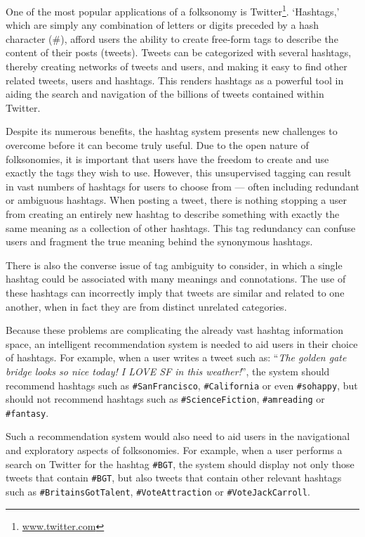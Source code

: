 \documentclass[12pt,a4paper]{article}
\begin{document}
One of the most popular applications of a folksonomy is Twitter\footnote{\url{www.twitter.com}}. `Hashtags,' which are simply any combination of letters or digits preceded by a hash character (\#), afford users the ability to create free-form tags to describe the content of their posts (tweets). Tweets can be categorized with several hashtags, thereby creating networks of tweets and users, and making it easy to find other related tweets, users and hashtags. This renders hashtags as a powerful tool in aiding the search and navigation of the billions of tweets contained within Twitter.

Despite its numerous benefits, the hashtag system presents new challenges to overcome before it can become truly useful. Due to the open nature of folksonomies, it is important that users have the freedom to create and use exactly the tags they wish to use. However, this unsupervised tagging can result in vast numbers of hashtags for users to choose from --- often including redundant or ambiguous hashtags. When posting a tweet, there is nothing stopping a user from creating an entirely new hashtag to describe something with exactly the same meaning as a collection of other hashtags. This tag redundancy can confuse users and fragment the true meaning behind the synonymous hashtags.

There is also the converse issue of tag ambiguity to consider, in which a single hashtag could be associated with many meanings and connotations. The use of these hashtags can incorrectly imply that tweets are similar and related to one another, when in fact they are from distinct unrelated categories.

Because these problems are complicating the already vast hashtag information space, an intelligent recommendation system is needed to aid users in their choice of hashtags. For example, when a user writes a tweet such as: ``\emph{The golden gate bridge looks so nice today! I LOVE SF in this weather!}'', the system should recommend hashtags such as \texttt{\#SanFrancisco}, \texttt{\#California} or even \texttt{\#sohappy}, but should not recommend hashtags such as \texttt{\#ScienceFiction}, \texttt{\#amreading} or \texttt{\#fantasy}.

Such a recommendation system would also need to aid users in the navigational and exploratory aspects of folksonomies. For example, when a user performs a search on Twitter for the hashtag \texttt{\#BGT}, the system should display not only those tweets that contain \texttt{\#BGT}, but also tweets that contain other relevant hashtags such as \texttt{\#BritainsGotTalent}, \texttt{\#VoteAttraction} or \texttt{\#VoteJackCarroll}.
\end{document}
